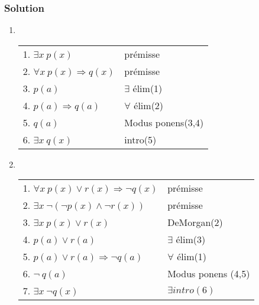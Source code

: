 {    \subsubsection*{Solution}
    \begin{enumerate}
     
     \item \hspace{1pt}\\
            \begin{tabular}{|l|l|}
            \hline
            1. $\exists x \  p(x)$ & prémisse \\
            2. $\forall x \  p(x) \Rightarrow q(x)$ & prémisse \\
            3. $p(a)$ & $\exists$ élim(1) \\
            4. $p(a) \Rightarrow q(a)$ & $\forall$ élim(2) \\ 
            5. $q(a)$ & Modus ponens(3,4) \\
            6. $\exists x \  q(x)$ & intro(5) \\
            \hline
            \end{tabular}
        
        \item \hspace{1pt}\\ 
            \begin{tabular}{|l|l|}
            \hline
            1. $\forall x \  p(x) \lor r(x) \Rightarrow \neg q(x)$ & prémisse \\
            2. $\exists x \  \neg (\neg p(x) \land \neg r(x))$ & prémisse \\
            3. $\exists x \  p(x) \lor r(x)$ & DeMorgan(2) \\
            4. $p(a) \lor r(a)$ & $\exists$ élim(3) \\ 
            5. $p(a) \lor r(a) \Rightarrow \neg q(a)$ & $\forall$ élim(1) \\
            6. $\neg \ q(a)$ & Modus ponens (4,5)\\
            7. $\exists x \  \neg q(x)$ & $\exists intro(6)$\\
            \hline
            \end{tabular}
            

\end{enumerate}}
